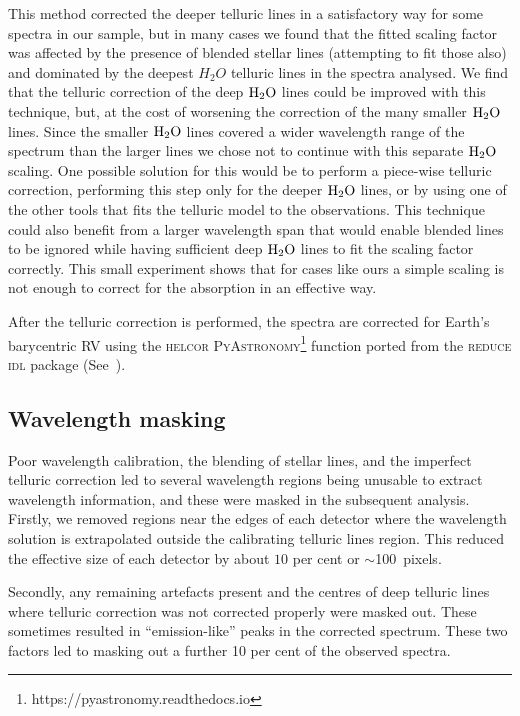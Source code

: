 \documentclass[fleqn,usenatbib]{mnras}
\newcommand*\bl{\color{blue}}
\begin{document}
    This method corrected the deeper telluric lines in a satisfactory way for some spectra in our sample, but in many cases we found that the fitted scaling factor was affected by the presence of blended stellar lines (attempting to fit those also) and dominated by the deepest \(H_{2}O\) telluric lines in the spectra analysed. We find that the telluric correction of the deep \(\rm H_{2}O\) lines could be improved with this technique, but, at the cost of worsening the correction of the many smaller \(\rm H_{2}O\) lines. Since the smaller \(\rm H_{2}O\) lines covered a wider wavelength range of the spectrum than the larger lines we chose not to continue with this separate \(\rm H_{2}O\) scaling. One possible solution for this would be to perform a piece-wise telluric correction, performing this step only for the deeper \( \rm H_{2}O\) lines, or by using one of the other tools that fits the telluric model to the observations. This technique could also benefit from a larger wavelength span that would enable blended lines to be ignored while having sufficient deep \(\rm H_{2}O\) lines to fit the scaling factor correctly. This small experiment shows that for cases like ours a simple scaling is not enough to correct for the absorption in an effective way.
    
    After the telluric correction is performed, the spectra are corrected for Earth's barycentric RV using the \textsc{helcor} \textsc{PyAstronomy}\footnote{https://pyastronomy.readthedocs.io} function ported from the \textsc{reduce idl} package (See~\citet[][]{piskunov_new_2002}).
    
    \subsection{Wavelength masking}
    {\bl Poor wavelength calibration, the blending of stellar lines, and the imperfect telluric correction led to several wavelength regions being unusable to extract wavelength information, and these were masked in the subsequent analysis.}
    Firstly, we removed regions near the edges of each detector where the wavelength solution is extrapolated outside the calibrating telluric lines region. This reduced the effective size of each detector by about \(10\) per cent or \(\sim\)100~pixels.
    
    Secondly, any remaining artefacts present and the centres of deep telluric lines where telluric correction was not corrected properly were masked out. These sometimes resulted in ``emission-like'' peaks in the corrected spectrum. These two factors led to masking out a further 10 per cent of the observed spectra.
    
\end{document}
